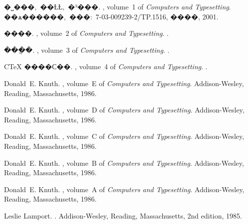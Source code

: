 
\begin{thebibliography}{10}

{�˽���,~��ȽȽ,~�³���}.
, volume~1 of {\em Computers and
Typesetting}.
\newblock ��ѧ������,~���:~7-03-009239-2/TP.1516, ����, 2001.

����.
, volume~2 of {\em Computers and
Typesetting}.
.

���ֲ�.
, volume~3 of {\em Computers and
Typesetting}.
.

C\TeX{} ����С��.
, volume~4 of {\em Computers and
Typesetting}.
.

Donald~E. Knuth.
, volume~E of {\em Computers and
  Typesetting}.
\newblock Addison-Wesley, Reading, Massachusetts, 1986.

Donald~E. Knuth.
, volume~D of {\em Computers and
  Typesetting}.
\newblock Addison-Wesley, Reading, Massachusetts, 1986.

Donald~E. Knuth.
, volume~C of {\em Computers and
  Typesetting}.
\newblock Addison-Wesley, Reading, Massachusetts, 1986.

Donald~E. Knuth.
, volume~B of {\em Computers and
  Typesetting}.
\newblock Addison-Wesley, Reading, Massachusetts, 1986.

Donald~E. Knuth.
, volume~A of {\em Computers and Typesetting}.
\newblock Addison-Wesley, Reading, Massachusetts, 1986.

Leslie Lamport.
.
\newblock Addison-Wesley, Reading, Massachusetts, 2nd edition, 1985.

\end{thebibliography}
